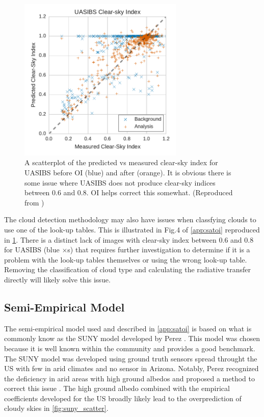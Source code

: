 \begin{figure}[h]
\centering
\includegraphics[width=0.7\textwidth]{figs/uasibs_scatter.pdf}
\caption[Scatterplot of predicted vs measured clear-sky index for
UASIBS]{A scatterplot of the predicted vs measured clear-sky index for
UASIBS before OI (blue) and after (orange). It is obvious there is
some issue where UASIBS does not produce clear-sky indices between 0.6
and 0.8. OI helps correct this somewhat. (Reproduced from
\cite{Lorenzo2017})}
\label{fig:uasibs_scatter}
\end{figure}

The cloud detection methodology may also have issues when classfying
clouds to use one of the look-up tables.
This is illustrated in Fig.\@ 4 of \cref{app:satoi} reproduced in
\cref{fig:uasibs_scatter}.
There is a distinct lack of images with clear-sky index between 0.6
and 0.8 for UASIBS (blue $\times$s) that requires further
investigation to determine if it is a problem with the look-up tables
themselves or using the wrong look-up table.
Removing the classification of cloud type and calculating the
radiative transfer directly will likely solve this issue.

\subsection{Semi-Empirical Model}
The semi-empirical model used and described in \cref{app:satoi} is
based on what is commonly know as the SUNY model developed by Perez
\etal \citep{Perez2002}.
This model was chosen because it is well known within the community
and provides a good benchmark.
The SUNY model was developed using ground truth sensors spread
throught the US with few in arid climates and no sensor in Arizona.
Notably, Perez \etal recognized the deficiency in arid areas with high
ground albedos and proposed a method to correct this issue
\citep{Perez2004}.
The high ground albedo combined with the empirical coefficients
developed for the US broadly likely lead to the overprediction of
cloudy skies in \cref{fig:suny_scatter}.

